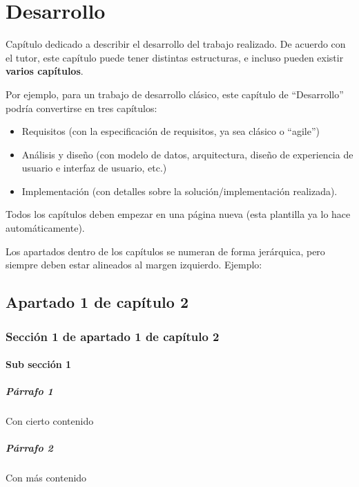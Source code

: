 \chapter{Desarrollo}
\label{ch:desarrollo}
Capítulo dedicado a describir el desarrollo del trabajo realizado. De acuerdo con el tutor, este capítulo puede tener distintas estructuras, e incluso pueden existir \textbf{varios capítulos}.

Por ejemplo, para un trabajo de desarrollo clásico, este capítulo de ``Desarrollo'' podría convertirse en tres capítulos:

\begin{itemize}
\item Requisitos (con la especificación de requisitos, ya sea clásico o ``agile'')
\item Análisis y diseño (con  modelo de datos, arquitectura, diseño de experiencia de usuario e interfaz de usuario, etc.)
\item Implementación (con detalles sobre la solución/implementación realizada).
\end{itemize}

Todos los capítulos deben empezar en una página nueva (esta plantilla ya lo hace automáticamente).

Los apartados dentro de los capítulos se numeran de forma jerárquica, pero siempre deben estar alineados al margen izquierdo. Ejemplo:

\section{Apartado 1 de capítulo 2}

\subsection{Sección 1 de apartado 1 de capítulo 2}

\subsubsection{Sub sección 1}

\paragraph{Párrafo 1} Con cierto contenido

\paragraph{Párrafo 2} Con más contenido

